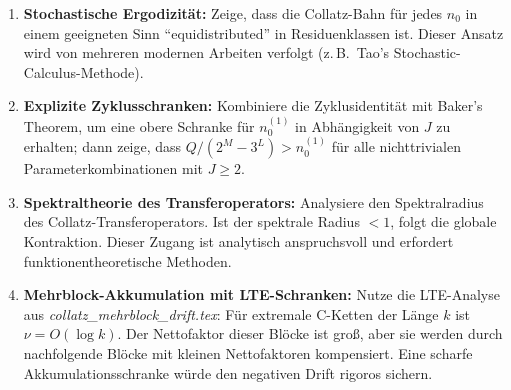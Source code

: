 \documentclass[12pt,a4paper]{article}
\begin{document}
\begin{enumerate}[label=\textbf{(\arabic*)}, leftmargin=*]
  \item \textbf{Stochastische Ergodizität:}
    Zeige, dass die Collatz-Bahn für jedes $n_0$ in einem geeigneten Sinn
    ``equidistributed'' in Residuenklassen ist. Dieser Ansatz wird von
    mehreren modernen Arbeiten verfolgt (z.\,B.\ Tao's Stochastic-Calculus-Methode).

  \item \textbf{Explizite Zyklusschranken:}
    Kombiniere die Zyklusidentität mit Baker's Theorem, um eine obere Schranke
    für $n_0^{(1)}$ in Abhängigkeit von $J$ zu erhalten; dann zeige, dass
    $Q/(2^M - 3^L) > n_0^{(1)}$ für alle nichttrivialen Parameterkombinationen
    mit $J \geq 2$.

  \item \textbf{Spektraltheorie des Transferoperators:}
    Analysiere den Spektralradius des Collatz-Transferoperators. Ist der
    spektrale Radius $< 1$, folgt die globale Kontraktion. Dieser Zugang
    ist analytisch anspruchsvoll und erfordert funktionentheoretische Methoden.

  \item \textbf{Mehrblock-Akkumulation mit LTE-Schranken:}
    Nutze die LTE-Analyse aus \textit{collatz\_mehrblock\_drift.tex}: Für
    extremale C-Ketten der Länge $k$ ist $\nu = O(\log k)$. Der Nettofaktor
    dieser Blöcke ist groß, aber sie werden durch nachfolgende Blöcke mit
    kleinen Nettofaktoren kompensiert. Eine scharfe Akkumulationsschranke
    würde den negativen Drift rigoros sichern.
\end{enumerate}
\end{document}
